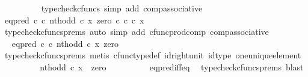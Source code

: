 \begin{isabellebody}
\ \ \ \ \ \ \ \ \isamarkupfalse%
\ {\isacharparenleft}{\kern0pt}typecheck{\isacharunderscore}{\kern0pt}cfuncs{\isacharcomma}{\kern0pt}\ simp\ add{\isacharcolon}{\kern0pt}\ comp{\isacharunderscore}{\kern0pt}associative{}{\isacharparenright}{\kern0pt}\isanewline
\ \ \ \ \ \ \isamarkupfalse%
\ \isamarkupfalse%
\ {\isachardoublequoteopen}eq{\isacharunderscore}{\kern0pt}pred\ {\isasymnat}\isactrlsub c\ {\isasymcirc}\isactrlsub c\ {\isasymlangle}nth{\isacharunderscore}{\kern0pt}odd\ {\isasymcirc}\isactrlsub c\ x{\isacharcomma}{\kern0pt}\ zero\ {\isasymcirc}\isactrlsub c\ {\isasymbeta}\isactrlbsub {\isasymnat}\isactrlsub c\isactrlesub \ {\isasymcirc}\isactrlsub c\ x{\isasymrangle}\ {\isacharequal}{\kern0pt}\ {\isasymt}{\isachardoublequoteclose}\isanewline
\ \ \ \ \ \ \ \ \isamarkupfalse%
\ {\isacharparenleft}{\kern0pt}typecheck{\isacharunderscore}{\kern0pt}cfuncs{\isacharunderscore}{\kern0pt}prems{\isacharcomma}{\kern0pt}\ auto\ simp\ add{\isacharcolon}{\kern0pt}\ cfunc{\isacharunderscore}{\kern0pt}prod{\isacharunderscore}{\kern0pt}comp\ comp{\isacharunderscore}{\kern0pt}associative{}{\isacharparenright}{\kern0pt}\isanewline
\ \ \ \ \ \ \isamarkupfalse%
\ \isamarkupfalse%
\ {\isachardoublequoteopen}eq{\isacharunderscore}{\kern0pt}pred\ {\isasymnat}\isactrlsub c\ {\isasymcirc}\isactrlsub c\ {\isasymlangle}nth{\isacharunderscore}{\kern0pt}odd\ {\isasymcirc}\isactrlsub c\ x{\isacharcomma}{\kern0pt}\ zero{\isasymrangle}\ {\isacharequal}{\kern0pt}\ {\isasymt}{\isachardoublequoteclose}\isanewline
\ \ \ \ \ \ \ \ \isamarkupfalse%
\ {\isacharparenleft}{\kern0pt}typecheck{\isacharunderscore}{\kern0pt}cfuncs{\isacharunderscore}{\kern0pt}prems{\isacharcomma}{\kern0pt}\ metis\ cfunc{\isacharunderscore}{\kern0pt}type{\isacharunderscore}{\kern0pt}def\ id{\isacharunderscore}{\kern0pt}right{\isacharunderscore}{\kern0pt}unit\ id{\isacharunderscore}{\kern0pt}type\ one{\isacharunderscore}{\kern0pt}unique{\isacharunderscore}{\kern0pt}element{\isacharparenright}{\kern0pt}\isanewline
\ \ \ \ \ \ \isamarkupfalse%
\ \isamarkupfalse%
\ {\isachardoublequoteopen}nth{\isacharunderscore}{\kern0pt}odd\ {\isasymcirc}\isactrlsub c\ x\ {\isacharequal}{\kern0pt}\ zero{\isachardoublequoteclose}\isanewline
\ \ \ \ \ \ \ \ \isamarkupfalse%
\ eq{\isacharunderscore}{\kern0pt}pred{\isacharunderscore}{\kern0pt}iff{\isacharunderscore}{\kern0pt}eq\ \isamarkupfalse%
\ {\isacharparenleft}{\kern0pt}typecheck{\isacharunderscore}{\kern0pt}cfuncs{\isacharunderscore}{\kern0pt}prems{\isacharcomma}{\kern0pt}\ blast{\isacharparenright}{\kern0pt}\isanewline

\end{isabellebody}
